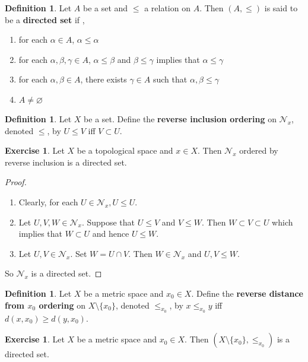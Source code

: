 \documentclass[12pt]{amsart}
\theoremstyle{definition}
\newtheorem{defn}[definition]{Definition}
\newtheorem{ex}[definition]{Exercise}
\newcommand{\al}{\alpha}
\newcommand{\gam}{\gamma}
\newcommand{\be}{\beta}
\newcommand{\MN}{\mathcal{N}}
\newcommand{\tbf}[1]{\textbf{#1}}
\DeclareMathOperator*{\0}{\mbf{0}}
\DeclareMathOperator*{\1}{\mbf{1}}
\newcommand{\lex}[1]{\label{ex:#1}}
\newcommand{\ld}[1]{\label{defn:#1}}
\begin{document}
	\begin{defn} \ld{33001}
	Let $A$ be a set and $\leq$ a relation on $A$. Then $(A, \leq)$ is said to be a \tbf{directed set} if , 
	\begin{enumerate}
	\item for each $\al \in A$, $\al \leq \al$
	\item for each $\al, \be, \gam \in A$, $\al \leq \be$ and $\be \leq \gam$ implies that $\al \leq \gam$
	\item for each $\al, \be \in A$, there exists $\gam \in A$ such that $\al, \be \leq \gam$
	\item $A \neq \varnothing$
	\end{enumerate}
	\end{defn}
	
	\begin{defn} \ld{33002}
	Let $X$ be a set. Define the \tbf{reverse inclusion ordering} on $\MN_x$, denoted $\leq$, by $U \leq V$ iff $V \subset U$. 
	\end{defn}
	
	\begin{ex} \lex{33003}
	Let $X$ be a topological space and $x \in X$. Then $\MN_x$ ordered by reverse inclusion is a directed set.
	\end{ex}
	
	\begin{proof}\
	\begin{enumerate}
	\item Clearly, for each $U \in \MN_x, U \leq U$.
	\item Let $U,V,W \in \MN_x$. Suppose that $U \leq V$ and $V \leq W$. Then $W \subset V \subset U$ which implies that $W \subset U$ and hence $U \leq W$.
	\item Let $U,V \in \MN_x$. Set $W = U \cap V$. Then $W \in \MN_x$ and $U,V \leq W$. 
	\end{enumerate}
	So $\MN_x$ is a directed set. 
	\end{proof}

	\begin{defn}
		Let $X$ be a metric space and $x_0 \in X$. Define the \tbf{reverse distance from $x_0$ ordering} on $X \setminus \{x_0\}$, denoted $\leq_{x_0}$, by $x \leq_{x_0} y$ iff $d(x, x_0) \geq d(y, x_0)$.
	\end{defn}

	\begin{ex}
		 Let $X$ be a metric space and $x_0 \in X$. Then $(X \setminus \{x_0\}, \leq_{x_0})$ is a directed set. 
	\end{ex}
\end{document}
